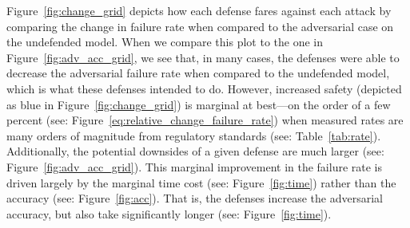 \documentclass[journal]{IEEEtran}
\begin{document}
Figure~\ref{fig:change_grid} depicts how each defense fares against each attack by comparing the change in failure rate when compared to the adversarial case on the undefended model. When we compare this plot to the one in Figure~\ref{fig:adv_acc_grid}, we see that, in many cases, the defenses were able to decrease the adversarial failure rate when compared to the undefended model, which is what these defenses intended to do. However, increased safety (depicted as blue in Figure~\ref{fig:change_grid}) is marginal at best---on the order of a few percent (see: Figure~\ref{eq:relative_change_failure_rate}) when measured rates are many orders of magnitude from regulatory standards (see: Table~\ref{tab:rate}). Additionally, the potential downsides of a given defense are much larger (see: Figure~\ref{fig:adv_acc_grid}). This marginal improvement in the failure rate is driven largely by the marginal time cost (see: Figure~\ref{fig:time}) rather than the accuracy (see: Figure~\ref{fig:acc}). That is, the defenses increase the adversarial accuracy, but also take significantly longer (see: Figure~\ref{fig:time}).
\end{document}
